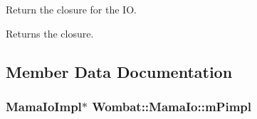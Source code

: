 Return the closure for the IO. \begin{DoxyReturn}{Returns}
the closure. 
\end{DoxyReturn}


\subsection{Member Data Documentation}
\hypertarget{classWombat_1_1MamaIo_af24af9208dd5bb80f81ccd089f8bd6ac}{
\subsubsection[{mPimpl}]{\setlength{\rightskip}{0pt plus 5cm}MamaIoImpl$\ast$ {\bf Wombat::MamaIo::mPimpl}}}
\label{classWombat_1_1MamaIo_af24af9208dd5bb80f81ccd089f8bd6ac}
